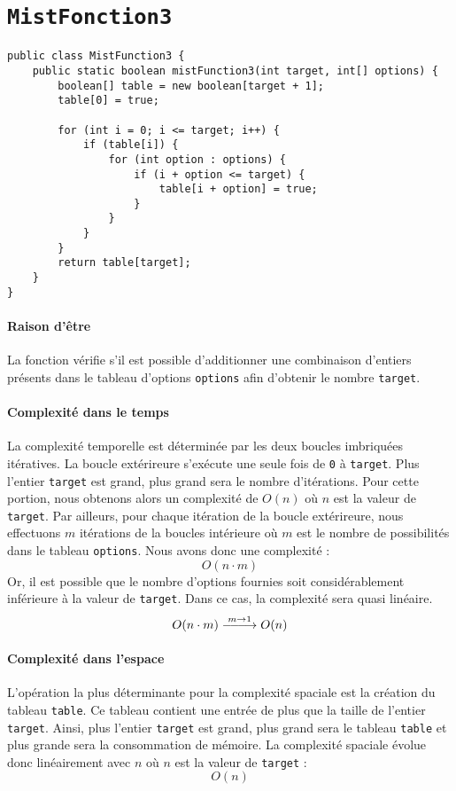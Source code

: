 \documentclass[10pt]{report}
\DeclareRobustCommand{\looongrightarrow}{%
  \DOTSB\relbar\joinrel\relbar\joinrel\relbar\joinrel\rightarrow
}
\DeclareRobustCommand{\looongrightarrow}{%
  \DOTSB\relbar\joinrel\relbar\joinrel\relbar\joinrel\rightarrow
}
\begin{document}
  \section{\texttt{MistFonction3}}
  \begin{lstlisting}[style=JavaDraculaWhite]
 public class MistFunction3 {
    public static boolean mistFunction3(int target, int[] options) {
        boolean[] table = new boolean[target + 1];
        table[0] = true;

        for (int i = 0; i <= target; i++) {
            if (table[i]) {
                for (int option : options) {
                    if (i + option <= target) {
                        table[i + option] = true;
                    }
                }
            }
        }
        return table[target];
    }
}    
  \end{lstlisting}


  \paragraph{Raison d'être}
  La fonction vérifie s'il est possible d'additionner une combinaison 
  d'entiers présents 
  dans le tableau d'options \texttt{options} afin d'obtenir le nombre 
  \texttt{target}.


  \paragraph{Complexité dans le temps}
  La complexité temporelle est déterminée par les deux boucles imbriquées 
  itératives. La boucle extérireure s'exécute une seule fois de 
  \texttt{0} à \texttt{target}. Plus l'entier \texttt{target} est grand, 
  plus grand sera le nombre d'itérations. Pour cette portion, nous obtenons alors 
  un complexité de $O(n)$ où $n$ est la valeur de \texttt{target}. Par ailleurs, 
  pour chaque itération de la boucle extérireure, nous effectuons $m$ itérations 
  de la boucles intérieure où $m$ est le nombre de possibilités dans le 
  tableau \texttt{options}. Nous avons donc une complexité :
           \[ O( n \cdot m)\]
  Or, il est possible que le nombre d'options fournies soit considérablement 
  inférieure à la valeur de \texttt{target}. Dans ce cas, la complexité         
  sera quasi linéaire.  
          \[O(n \cdot m) \stackrel{m \to 1}{\looongrightarrow} O(n) \]


  \paragraph{Complexité dans l'espace}
  L'opération la plus déterminante pour la complexité spaciale est la création 
  du tableau \texttt{table}. Ce tableau contient une entrée de plus que la taille de l'entier 
  \texttt{target}. Ainsi, plus l'entier \texttt{target} est grand, plus grand 
  sera le tableau \texttt{table} et plus grande sera la consommation de mémoire. 
  La complexité spaciale évolue donc linéairement avec $n$ où $n$ est la 
  valeur de \texttt{target} :
  \[ O(n) \]
\end{document}
